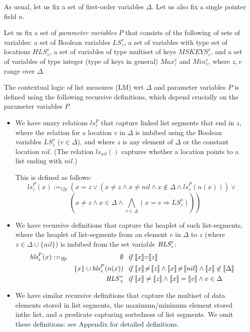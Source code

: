 As usual, let us fix a set of first-order variables $\Delta$.
Let us also fix a single pointer field $n$.

\begin{definition}
Let us fix a set of \emph{parameter variables} $P$ that consists of the following of sets of variables:
a set of Boolean variables $LS_z^v$, a set of variables with type set of locations
$HLS_z^v$, a set of variables of type multiset of keys $MSKEYS_z^v$, and
a set of variables of type integer (type of keys in general) $Max_z^v$ and $Min_z^v$, where $z,v$ range over $\Delta$.

The contextual logic of list measures (LM) wrt $\Delta$ and parameter variables $P$ is defined using the following recursive definitions, which depend crucially on the parameter variables $P$.
\begin{itemize}
	\item We have unary relations $ls_z^P$ that capture linked list segments 
	       that end in $z$, where
	         the relation for a location $v$ in $\Delta$ is imbibed using the Boolean variables $LS_z^v$ ($v \in \Delta$),
	      and where $z$ is any element of $\Delta$ or the constant location $\textit{nil}$.
	      (The relation $ls_\textit{nil}()$ captures whether a location points to a list
	       ending with $\textit{nil}$.)
	
	This is defined as follows:
	$$\textit{ls}_z^P(x)\!\!:=_{\textit{lfp}}\!\! \left( x\!\!=\!\!\textit{z} \vee \left( x \!\not =\! z \wedge x \!\not=\! nil \wedge x \not \in \Delta \wedge \textit{ls}_z^P(n(x))\right) 
	\vee\right.$$
	$$~~~~ \left.\left(x \!\not =\! z \wedge x \in \Delta \wedge \bigwedge_{v \in \Delta} (x=v \Rightarrow LS_z^v)\right)\right)$$ 
	           

    \item We have recursive definitions that capture the heaplet of such list-segments, where the heaplet
of list-segments from an element $v$ in $\Delta$ to $z$ (where $z \in \Delta \cup \{nil\}$) is imbibed from the set variable $\textit{HLS}_z^v$:
\begin{align*}
\textit{hls}_z^P(x) & :=_{\textit{lfp}} & \emptyset & \textit{~~if~} \sem{x}\!\!=\!\!\sem{z} \\
& & \{x\} \cup \textit{hls}_z^P(n(x)) & \textit{~~if~} \sem{x} \!\not =\! \sem{z} \wedge \sem{x} \!\not=\! \sem{nil} \wedge \sem{x} \not \in \sem{\Delta} \\
& & \HLS\,_z^v & \textit{~~if~} \sem{x} \not = \sem{z} \wedge \sem{x}=\sem{v} \wedge v \in \Delta 
\end{align*}

\item We have similar recursive definitions that capture the multiset of data elements stored in list segments, the maximum/minimum element stored inthe list, and a predicate capturing sortedness of list segments. We omit these definitions: see Appendix for detailed definitions.    

\end{itemize}
\end{definition}


